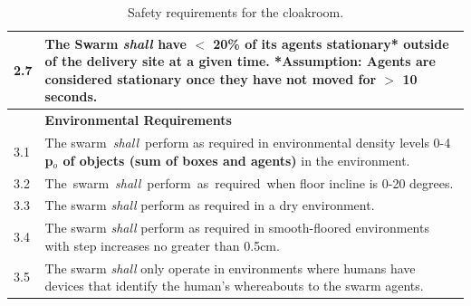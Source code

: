 \documentclass[runningheads]{llncs}
\begin{document}
\begin{table}[!t]
\begin{tabular}{p{5mm} p{116mm} }
		\hline
		2.7 & The Swarm \emph{shall} have \textbf{$<$ 20\%} of its agents \textbf{stationary*} outside of the \textbf{delivery site} at a given time.
		*Assumption: Agents are considered stationary once they have not moved for $>$ 10 seconds. \\
		\hline
		& \textbf{Environmental Requirements}\\
		\hline
		3.1 & The swarm \emph{shall} perform as required in environmental density levels 0-4 \textbf{p$_o$ of objects (sum of boxes and agents)} in the environment. %
		\\ 
		\hline
		3.2 & The swarm \emph{shall} perform as required when floor incline is 0-20 degrees.
		\\ 
		\hline
		3.3 & The swarm \emph{shall} perform as required in a dry environment.
		\\ 
		\hline
		3.4 & The swarm \emph{shall} perform as required in smooth-floored environments with step increases no greater than 0.5cm.
		\\ 
		\hline
		3.5 & The swarm \emph{shall} only operate in environments where humans have devices that identify the human’s whereabouts to the swarm agents.
		\\		[1ex] 		
		\hline
	\end{tabular}
	\caption{\label{tab:reqs}Safety requirements for the cloakroom.}
		\vspace{-4ex}
\end{table}
\normalsize
\end{document}

